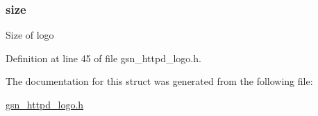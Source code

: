 \hypertarget{a00096_a68890417cb73114517d0d8c594bd282e}{
\subsubsection[{size}]{ {\bf size}}}
\label{a00096_a68890417cb73114517d0d8c594bd282e}
Size of logo 

Definition at line 45 of file gsn\_\-httpd\_\-logo.h.



The documentation for this struct was generated from the following file:\begin{DoxyCompactItemize}
\item 
\hyperlink{a00513}{gsn\_\-httpd\_\-logo.h}\end{DoxyCompactItemize}
